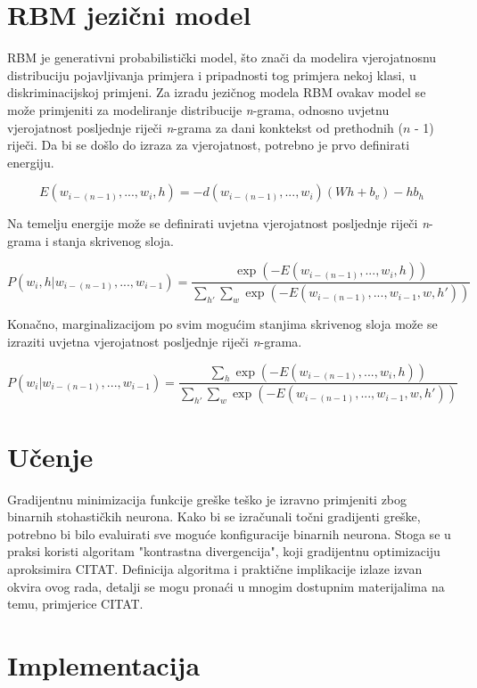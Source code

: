 \documentclass[times, utf8, diplomski, numeric]{fer}
\begin{document}
\section{RBM jezični model}

RBM je generativni probabilistički model, što znači da modelira vjerojatnosnu distribuciju pojavljivanja primjera i pripadnosti tog primjera nekoj klasi, u diskriminacijskoj primjeni. Za izradu jezičnog modela RBM ovakav model se može primjeniti za modeliranje distribucije \textit{n}-grama, odnosno uvjetnu vjerojatnost posljednje riječi \textit{n}-grama za dani konktekst od prethodnih ($n$ - 1) riječi. Da bi se došlo do izraza za vjerojatnost, potrebno je prvo definirati energiju.

\[
E(w_{i - (n - 1)}, ... , w_i, h) =  - d(w_{i - (n - 1)}, ... , w_i) (W h + b_v) - h b_h
\]

Na temelju energije može se definirati uvjetna vjerojatnost posljednje riječi \textit{n}-grama i stanja skrivenog sloja.

\[
P(w_i, h | w_{i - (n - 1)}, ... , w_{i - 1})
 = \frac{\exp(-E(w_{i - (n - 1)}, ... , w_i, h))}
  {\sum_{h'} \sum_w \exp(-E(w_{i - (n - 1)}, ... , w_{i - 1}, w, h'))}
\]

Konačno, marginalizacijom po svim mogućim stanjima skrivenog sloja može se izraziti uvjetna vjerojatnost posljednje riječi \textit{n}-grama.

\[
P(w_i | w_{i - (n - 1)}, ... , w_{i - 1})
 = \frac{\sum_h \exp(-E(w_{i - (n - 1)}, ... , w_i, h))}
  {\sum_{h'} \sum_w \exp(-E(w_{i - (n - 1)}, ... , w_{i - 1}, w, h'))}
\]

\section{Učenje}

Gradijentnu minimizacija funkcije greške  teško je izravno primjeniti zbog binarnih stohastičkih neurona. Kako bi se izračunali točni gradijenti greške, potrebno bi bilo evaluirati sve moguće konfiguracije binarnih neurona. Stoga se u praksi koristi algoritam "kontrastna divergencija", koji gradijentnu optimizaciju aproksimira CITAT. Definicija algoritma i praktične implikacije izlaze izvan okvira ovog rada, detalji se mogu pronaći u mnogim dostupnim materijalima na temu, primjerice CITAT.

\section{Implementacija}
\end{document}

